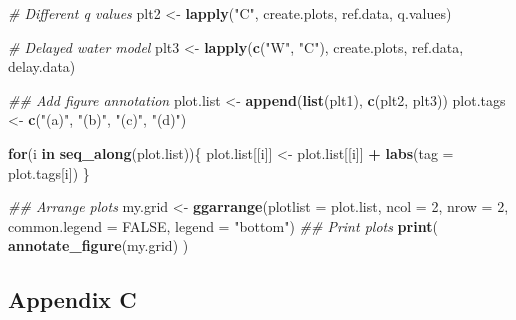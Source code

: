 \documentclass[
]{article}
\newenvironment{Shaded}{\begin{snugshade}}{\end{snugshade}}
\newcommand{\CommentTok}[1]{\textcolor[rgb]{0.56,0.35,0.01}{\textit{#1}}}
\newcommand{\ControlFlowTok}[1]{\textcolor[rgb]{0.13,0.29,0.53}{\textbf{#1}}}
\newcommand{\DataTypeTok}[1]{\textcolor[rgb]{0.13,0.29,0.53}{#1}}
\newcommand{\DecValTok}[1]{\textcolor[rgb]{0.00,0.00,0.81}{#1}}
\newcommand{\KeywordTok}[1]{\textcolor[rgb]{0.13,0.29,0.53}{\textbf{#1}}}
\newcommand{\NormalTok}[1]{#1}
\newcommand{\OperatorTok}[1]{\textcolor[rgb]{0.81,0.36,0.00}{\textbf{#1}}}
\newcommand{\OtherTok}[1]{\textcolor[rgb]{0.56,0.35,0.01}{#1}}
\newcommand{\StringTok}[1]{\textcolor[rgb]{0.31,0.60,0.02}{#1}}
\begin{document}
\begin{Shaded}
\begin{Highlighting}[numbers=left,,]
\CommentTok{\# Different q values}
\NormalTok{plt2 \textless{}{-}}\StringTok{ }\KeywordTok{lapply}\NormalTok{(}\StringTok{"C"}\NormalTok{, create.plots, ref.data, q.values)}

\CommentTok{\# Delayed water model}
\NormalTok{plt3 \textless{}{-}}\StringTok{ }\KeywordTok{lapply}\NormalTok{(}\KeywordTok{c}\NormalTok{(}\StringTok{"W"}\NormalTok{, }\StringTok{"C"}\NormalTok{), create.plots, ref.data, delay.data)}

\CommentTok{\#\# Add figure annotation}
\NormalTok{plot.list \textless{}{-}}\StringTok{ }\KeywordTok{append}\NormalTok{(}\KeywordTok{list}\NormalTok{(plt1), }\KeywordTok{c}\NormalTok{(plt2, plt3))}
\NormalTok{plot.tags \textless{}{-}}\StringTok{ }\KeywordTok{c}\NormalTok{(}\StringTok{"(a)"}\NormalTok{, }\StringTok{"(b)"}\NormalTok{, }\StringTok{"(c)"}\NormalTok{, }\StringTok{"(d)"}\NormalTok{)}

\ControlFlowTok{for}\NormalTok{(i }\ControlFlowTok{in} \KeywordTok{seq\_along}\NormalTok{(plot.list))\{}
\NormalTok{  plot.list[[i]] \textless{}{-}}\StringTok{ }\NormalTok{plot.list[[i]] }\OperatorTok{+}\StringTok{ }\KeywordTok{labs}\NormalTok{(}\DataTypeTok{tag =}\NormalTok{ plot.tags[i])}
\NormalTok{\}}

\CommentTok{\#\# Arrange plots}
\NormalTok{my.grid \textless{}{-}}\StringTok{ }\KeywordTok{ggarrange}\NormalTok{(}\DataTypeTok{plotlist =}\NormalTok{ plot.list, }\DataTypeTok{ncol =} \DecValTok{2}\NormalTok{, }\DataTypeTok{nrow =} \DecValTok{2}\NormalTok{,}
                     \DataTypeTok{common.legend =} \OtherTok{FALSE}\NormalTok{, }\DataTypeTok{legend =} \StringTok{"bottom"}\NormalTok{)}
\CommentTok{\#\# Print plots}
\KeywordTok{print}\NormalTok{( }\KeywordTok{annotate\_figure}\NormalTok{(my.grid) )}
\end{Highlighting}
\end{Shaded}

\hypertarget{appendix-c}{%
\subsection{Appendix C}\label{appendix-c}}
\end{document}
